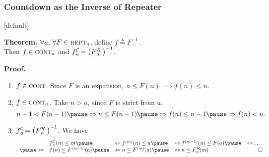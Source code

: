 \begin{frame}
\frametitle{Countdown as the Inverse of Repeater}
\setlength{\leftmargini}{3.5em}
[default]

\textbf{Theorem.} $\forall a$, $\forall F\in \text{\scshape{rept}}_a$, define $f\triangleq F^{-1}$. 
\\ Then $f\in \text{\scshape{cont}}_a$ and $\cdt{f}{a}~ = \left(\rf{F}{a}\ \right)^{-1}$.

\bigskip

\pause 
\textbf{Proof.}

\begin{enumerate}
	\pause 
	\item $f\in \text{\scshape{cont}}$. \pause  Since $F$ is an expansion, $n \le F(n)\implies f(n)\le n$.
	
	\smallskip
	
	\pause 
	\item $f\in \text{\scshape{cont}}_a$. \pause Take $n> a$, since $F$ is strict from $a$, \pause 
	\begin{equation*}
	\displayindent0pt
	\displaywidth\textwidth
	n-1 < F(n-1) \pause \implies n\le F(n-1) \pause \implies f(n)\le n - 1 \pause \implies f(n) < n.
	\end{equation*}
	\vspace{-2em}
	
	\pause 
	\item $\cdt{f}{a}~ = \left(\rf{F}{a}\ \right)^{-1}$. \pause  We have
	\begin{equation*}
	\displayindent0pt
	\displaywidth\textwidth
	\begin{array}{lllll}
	& \cdt{f}{a}(n)\le m \pause & \iff f^{(m)}(n)\le a \pause & \iff f^{(m-1)}(n)\le F(a) \pause & \iff \ldots \\
    \pause \iff & f(n)\le F^{(m-1)}(a) \pause & \iff n\le F^{(m)}(a) \pause & \iff n\le \rf{F}{a}(m) & \qed
	\end{array}
	\vspace{-0.5em}
	\end{equation*}
\end{enumerate}

\end{frame}


